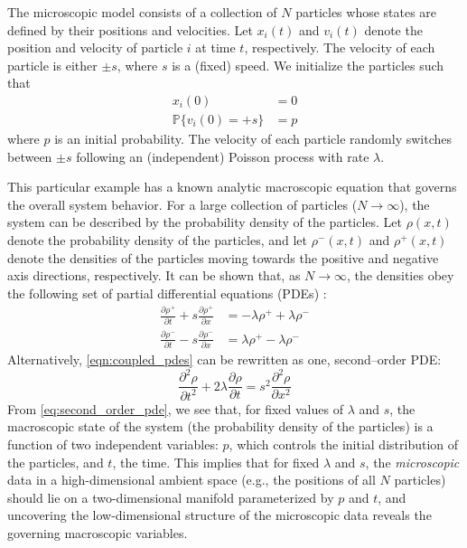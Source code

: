 \documentclass[prl, reprint]{revtex4-1}
\begin{document}
The microscopic model consists of a collection of $N$ particles whose states are defined by their positions and velocities. 
%
Let $x_i(t)$ and $v_i(t)$ denote the position and velocity of particle $i$ at time $t$, respectively.
%
The velocity of each particle is either $\pm s$, where $s$ is a (fixed) speed. 
%
We initialize the particles such that
\begin{equation}\label{eqn:system}
\begin{aligned}
x_i(0) & = 0 \\
\mathbb{P} \{ v_i(0) = +s \} & = p
\end{aligned}
\end{equation}
where $p$ is an initial probability.
%
The velocity of each particle randomly switches between $\pm s$ following an (independent) Poisson process with rate $\lambda$.
%

This particular example has a known analytic macroscopic equation that governs the overall system behavior.
%
For a large collection of particles ($N \rightarrow \infty$), the system can be described by the probability density of the particles.
%
Let $\rho(x, t)$ denote the probability density of the particles, and let $\rho^-(x, t)$ and $\rho^+(x, t)$ denote the densities of the particles moving towards the positive and negative axis directions, respectively.
%
It can be shown that, as $N \rightarrow \infty$, the densities obey the following set of partial differential equations (PDEs) \cite{othmer2000diffusion}:
\begin{equation} \label{eqn:coupled_pdes}
\begin{aligned}
\frac{\partial \rho^+}{\partial t} + s \frac{\partial \rho^+}{\partial x} & = -\lambda \rho^+ +\lambda \rho^- \\
\frac{\partial \rho^-}{\partial t} - s \frac{\partial \rho^-}{\partial x} & = \lambda \rho^+ -\lambda \rho^- 
\end{aligned}
\end{equation}
%
Alternatively, \eqref{eqn:coupled_pdes} can be rewritten as one, second--order PDE:
\begin{equation} \label{eq:second_order_pde}
\frac{\partial^2 \rho}{\partial t^2} + 2 \lambda \frac{\partial \rho}{\partial t} = s^2 \frac{\partial ^2 \rho}{\partial x^2}
\end{equation}
%
%
From \eqref{eq:second_order_pde}, we see that, for fixed values of $\lambda$ and $s$, the macroscopic state of the system (the probability density of the particles) is a function of two independent variables: $p$, which controls the initial distribution of the particles, and $t$, the time. 
%
This implies that for fixed $\lambda$ and $s$, the {\em microscopic} data in a high-dimensional ambient space (e.g., the positions of all $N$ particles) should lie on a two-dimensional manifold parameterized by $p$ and $t$, 
and uncovering the low-dimensional structure of the microscopic data reveals the governing macroscopic variables.
\end{document}
